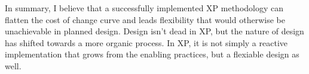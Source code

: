 \documentclass[paper=a4, fontsize=11pt]{scrartcl}	%
\numberwithin{equation}{section}															%
\numberwithin{figure}{section}																%
\numberwithin{table}{section}
\begin{document}
In summary, I believe that a successfully implemented XP methodology can flatten the cost of change curve and leads flexibility that would otherwise be unachievable in planned design. Design isn't dead in XP, but the nature of design has shifted towards a more organic process. In XP, it is not simply a reactive implementation that grows from the enabling practices, but a flexiable design as well.

\clearpage


\end{document}
